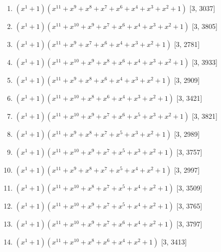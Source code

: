 \documentclass[10pt,twocolumn]{article}
\begin{document}
\begin{enumerate}
\item $(x^{1} + 1)(x^{11} + x^{9} + x^{8} + x^{7} + x^{6} + x^{4} + x^{3} + x^{2} + 1)$  [3, 3037]
\item $(x^{1} + 1)(x^{11} + x^{10} + x^{9} + x^{7} + x^{6} + x^{4} + x^{3} + x^{2} + 1)$  [3, 3805]
\item $(x^{1} + 1)(x^{11} + x^{9} + x^{7} + x^{6} + x^{4} + x^{3} + x^{2} + 1)$  [3, 2781]
\item $(x^{1} + 1)(x^{11} + x^{10} + x^{9} + x^{8} + x^{6} + x^{4} + x^{3} + x^{2} + 1)$  [3, 3933]
\item $(x^{1} + 1)(x^{11} + x^{9} + x^{8} + x^{6} + x^{4} + x^{3} + x^{2} + 1)$  [3, 2909]
\item $(x^{1} + 1)(x^{11} + x^{10} + x^{8} + x^{6} + x^{4} + x^{3} + x^{2} + 1)$  [3, 3421]
\item $(x^{1} + 1)(x^{11} + x^{10} + x^{9} + x^{7} + x^{6} + x^{5} + x^{3} + x^{2} + 1)$  [3, 3821]
\item $(x^{1} + 1)(x^{11} + x^{9} + x^{8} + x^{7} + x^{5} + x^{3} + x^{2} + 1)$  [3, 2989]
\item $(x^{1} + 1)(x^{11} + x^{10} + x^{9} + x^{7} + x^{5} + x^{3} + x^{2} + 1)$  [3, 3757]
\item $(x^{1} + 1)(x^{11} + x^{9} + x^{8} + x^{7} + x^{5} + x^{4} + x^{2} + 1)$  [3, 2997]
\item $(x^{1} + 1)(x^{11} + x^{10} + x^{8} + x^{7} + x^{5} + x^{4} + x^{2} + 1)$  [3, 3509]
\item $(x^{1} + 1)(x^{11} + x^{10} + x^{9} + x^{7} + x^{5} + x^{4} + x^{2} + 1)$  [3, 3765]
\item $(x^{1} + 1)(x^{11} + x^{10} + x^{9} + x^{7} + x^{6} + x^{4} + x^{2} + 1)$  [3, 3797]
\item $(x^{1} + 1)(x^{11} + x^{10} + x^{8} + x^{6} + x^{4} + x^{2} + 1)$  [3, 3413]
\end{enumerate}
\end{document}
